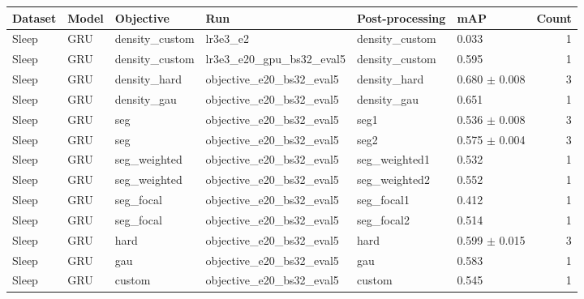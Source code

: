 \begin{tabular}{llllllr}
\toprule
Dataset & Model & Objective & Run & Post-processing & mAP & Count \\
\midrule
Sleep & GRU & density\_custom & lr3e3\_e2 & density\_custom & 0.033 & 1 \\
Sleep & GRU & density\_custom & lr3e3\_e20\_gpu\_bs32\_eval5 & density\_custom & 0.595 & 1 \\
Sleep & GRU & density\_hard & objective\_e20\_bs32\_eval5 & density\_hard & 0.680 $\pm$ 0.008 & 3 \\
Sleep & GRU & density\_gau & objective\_e20\_bs32\_eval5 & density\_gau & 0.651 & 1 \\
Sleep & GRU & seg & objective\_e20\_bs32\_eval5 & seg1 & 0.536 $\pm$ 0.008 & 3 \\
Sleep & GRU & seg & objective\_e20\_bs32\_eval5 & seg2 & 0.575 $\pm$ 0.004 & 3 \\
Sleep & GRU & seg\_weighted & objective\_e20\_bs32\_eval5 & seg\_weighted1 & 0.532 & 1 \\
Sleep & GRU & seg\_weighted & objective\_e20\_bs32\_eval5 & seg\_weighted2 & 0.552 & 1 \\
Sleep & GRU & seg\_focal & objective\_e20\_bs32\_eval5 & seg\_focal1 & 0.412 & 1 \\
Sleep & GRU & seg\_focal & objective\_e20\_bs32\_eval5 & seg\_focal2 & 0.514 & 1 \\
Sleep & GRU & hard & objective\_e20\_bs32\_eval5 & hard & 0.599 $\pm$ 0.015 & 3 \\
Sleep & GRU & gau & objective\_e20\_bs32\_eval5 & gau & 0.583 & 1 \\
Sleep & GRU & custom & objective\_e20\_bs32\_eval5 & custom & 0.545 & 1 \\
\bottomrule
\end{tabular}
